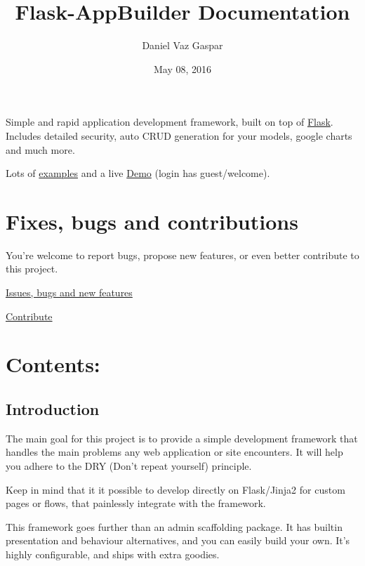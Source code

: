 \documentclass[letterpaper,10pt,english]{sphinxmanual}
\title{Flask-AppBuilder Documentation}
\date{May 08, 2016}
\author{Daniel Vaz Gaspar}
\begin{document}
\maketitle
\tableofcontents
{}\label{index::doc}

Simple and rapid application development framework, built on top of \href{http://flask.pocoo.org/}{Flask}.
Includes detailed security, auto CRUD generation for your models, google charts and much more.

Lots of \href{https://github.com/dpgaspar/Flask-AppBuilder/tree/master/examples}{examples}
and a live \href{http://flaskappbuilder.pythonanywhere.com/}{Demo} (login has guest/welcome).


\chapter{Fixes, bugs and contributions}
\label{index:module-flask.ext.appbuilder}\label{index:flask-appbuilder}\label{index:fixes-bugs-and-contributions}
You're welcome to report bugs, propose new features, or even better contribute to this project.

\href{https://github.com/dpgaspar/Flask-AppBuilder/issues/new}{Issues, bugs and new features}

\href{https://github.com/dpgaspar/Flask-AppBuilder/fork}{Contribute}


\chapter{Contents:}
\label{index:contents}

\section{Introduction}
\label{intro:introduction}\label{intro::doc}
The main goal for this project is to provide a simple development framework
that handles the main problems any web application or site encounters.
It will help you adhere to the DRY (Don't repeat yourself) principle.

Keep in mind that it it possible to develop directly on Flask/Jinja2 for custom pages or flows,
that painlessly integrate with the framework.

This framework goes further than an admin scaffolding package.
It has builtin presentation and behaviour alternatives, and you can easily build your own.
It's highly configurable, and ships with extra goodies.
\end{document}
